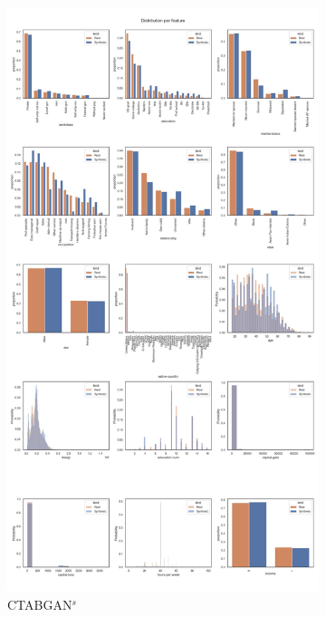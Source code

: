 \begin{landscape}
\begin{figure}[h]
		\hfill
		\begin{subfigure}{0.3\linewidth}
			\includegraphics[height=\textheight,width=\linewidth,keepaspectratio]{images/distributions_full/ctabgan_simTune.jpg}
			\caption{CTABGAN$^s$}
		\end{subfigure}	
		\hfill
		\begin{subfigure}{0.3\linewidth}

\end{subfigure}
\end{figure}
\end{landscape}
